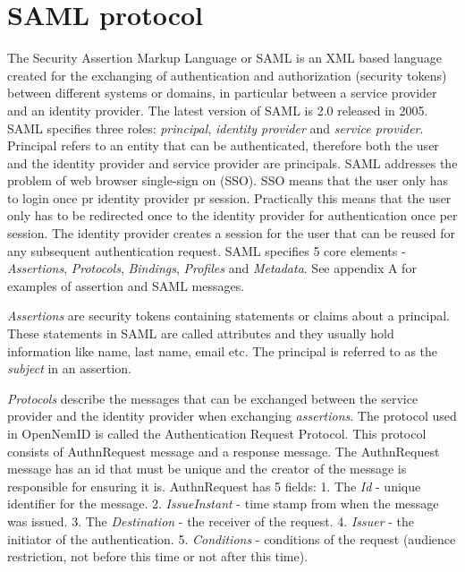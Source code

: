 \documentclass[twosided]{report}
\begin{document}
\section{SAML protocol}
The Security Assertion Markup Language or SAML is an XML based language created for the exchanging of authentication and authorization (security tokens) between different systems or domains, in particular between a service provider and an identity provider. The latest version of SAML is 2.0 released in 2005. SAML specifies three roles: \emph{principal}, \emph{identity provider} and \emph{service provider}. Principal refers to an entity that can be authenticated, therefore both the user and the identity provider and service provider are principals. SAML addresses the problem of web browser single-sign on (SSO). SSO means that the user only has to login once pr identity provider pr session. Practically this means that the user only has to be redirected once to the identity provider for authentication once per session. The identity provider creates a session for the user that can be reused for any subsequent authentication request. SAML specifies 5 core elements - \emph{Assertions}, \emph{Protocols}, \emph{Bindings}, \emph{Profiles} and \emph{Metadata}. See appendix A for examples of assertion and SAML messages.
\par
\emph{Assertions} are security tokens containing statements or claims about a principal. These statements in SAML are called attributes and they usually hold information like name, last name, email etc. The principal is referred to as the \emph{subject} in an assertion.
\par
\emph{Protocols} describe the messages that can be exchanged between the service provider and the identity provider when exchanging \emph{assertions}. The protocol used in OpenNemID is called the Authentication Request Protocol. This protocol consists of AuthnRequest message and a response message. The AuthnRequest message has an id that must be unique and the creator of the message is responsible for ensuring it is. AuthnRequest has 5 fields: 1. The \emph{Id} - unique identifier for the message. 2. \emph{IssueInstant} - time stamp from when the message was issued. 3. The \emph{Destination} - the receiver of the request. 4. \emph{Issuer} - the initiator of the authentication. 5. \emph{Conditions} - conditions of the request (audience restriction, not before this time or not after this time).
\par
\end{document}
